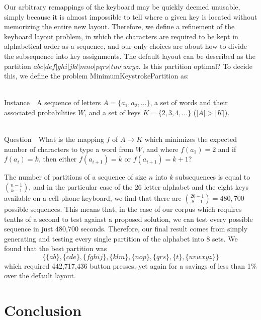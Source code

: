 \documentclass[runningheads]{llncs}
\newcommand{\Instance}{{\sc Instance~}}
\newcommand{\Question}{~\\
{\sc Question~}}
\begin{document}
Our arbitrary remappings of the keyboard may be quickly deemed unusable, simply
because it is almost impossible to tell where a given key is located without
memorizing the entire new layout.  Therefore, we define a refinement of the
keyboard layout problem, in which the characters are required to be kept in
alphabetical order as a sequence, and our only choices are about how to divide
the subsequence into key assignments.  The default layout can be described as
the partition
$abc|def|ghi|jkl|mno|pqrs|tuv|wxyz$.  Is this partition optimal?  To
decide this, we define the problem {\sc MinimumKeystrokePartition} as:
\begin{prob}[{\sc MinimumKeystrokePartition}]~\\
\label{thm:minpartition}
\Instance\ A sequence of letters $A = \{a_1, a_2, \ldots \}$, a set of words and their associated probabilities $W$, and a set of keys $K = \{2, 3, 4, \ldots \}$ ($|A| > |K|$).

\Question\ What is the mapping $f$ of $A \to K$ which minimizes the expected number of characters to type a word from $W$, and where $f(a_1) = 2$ and if $f(a_i) = k$, then either $f(a_{i+1}) = k$ or $f(a_{i+1}) = k+1$?
\end{prob}

The number of partitions of a sequence of size $n$ into $k$ subsequences is equal to $\binom{n-1}{k-1}$, and in the particular case of the 26 letter alphabet and the eight keys available on a cell phone keyboard, we find that there are $\binom{26-1}{8-1} = 480,700$ possible sequences.  This means that, in the case of our corpus which requires tenths of a second to test against a proposed solution, we can test every possible sequence in just 480,700 seconds.  Therefore, our final result comes from simply generating and testing every single partition of the alphabet into 8 sets.  We found that the best partition was 
$$\{\{ab\}, \{cde\}, \{fghij\}, \{klm\}, \{nop\}, \{qrs\}, \{t\}, \{uvwxyz\}\}$$
which required 442,717,436 button presses, yet again for a savings of less than 1\% over the default layout.

\section{Conclusion}
\end{document}
